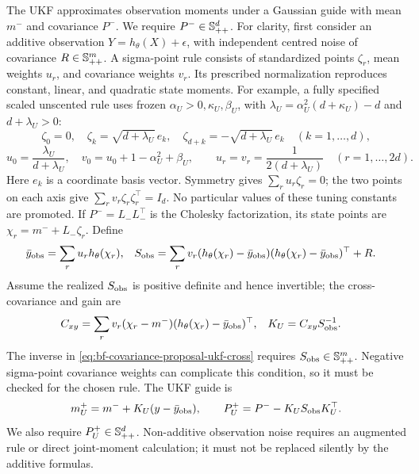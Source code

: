The UKF approximates observation moments under a Gaussian guide with mean
\(m^-\) and covariance \(P^-\). We require \(P^-\in\mathbb S_{++}^d\).
For clarity, first consider an additive observation
\(Y=h_\theta(X)+\epsilon\), with independent centred noise of covariance
\(R\in\mathbb S_{++}^m\). A sigma-point rule consists of standardized points
\(\zeta_r\), mean weights \(u_r\), and covariance weights \(v_r\).
Its prescribed normalization reproduces constant, linear, and quadratic
state moments. For example, a fully specified scaled unscented rule uses
frozen \(\alpha_U>0,\kappa_U,\beta_U\), with
\(\lambda_U=\alpha_U^2(d+\kappa_U)-d\) and \(d+\lambda_U>0\):
\[
 \zeta_0=0,\quad
 \zeta_k=\sqrt{d+\lambda_U}\,e_k,\quad
 \zeta_{d+k}=-\sqrt{d+\lambda_U}\,e_k
 \quad (k=1,\ldots,d),
\]
\[
 u_0=\frac{\lambda_U}{d+\lambda_U},\quad
 v_0=u_0+1-\alpha_U^2+\beta_U,\qquad
 u_r=v_r=\frac{1}{2(d+\lambda_U)}\quad(r=1,\ldots,2d).
\]
Here \(e_k\) is a coordinate basis vector. Symmetry gives
\(\sum_ru_r\zeta_r=0\); the two points on each axis give
\(\sum_rv_r\zeta_r\zeta_r^\top=I_d\).
No particular values of these tuning constants are promoted.
If \(P^-=L_-L_-^\top\) is the Cholesky factorization, its state
points are \(\chi_r=m^-+L_-\zeta_r\). Define
\begin{align}
\label{eq:bf-covariance-proposal-ukf-observation}
 \bar y_{\rm obs}&=\sum_r u_r h_\theta(\chi_r),&
 S_{\rm obs}&=\sum_r v_r(h_\theta(\chi_r)-\bar y_{\rm obs})
                  (h_\theta(\chi_r)-\bar y_{\rm obs})^\top+R.
\end{align}
Assume the realized \(S_{\rm obs}\) is positive definite and hence
invertible; the cross-covariance and gain are
\begin{align}
\label{eq:bf-covariance-proposal-ukf-cross}
 C_{xy}&=\sum_r v_r(\chi_r-m^-)
                  (h_\theta(\chi_r)-\bar y_{\rm obs})^\top,&
 K_U&=C_{xy}S_{\rm obs}^{-1}.
\end{align}
The inverse in \eqref{eq:bf-covariance-proposal-ukf-cross} requires \(S_{\rm obs}\in\mathbb S_{++}^m\).
Negative sigma-point covariance weights can complicate this condition, so it
must be checked for the chosen rule. The UKF guide is
\begin{equation}
\label{eq:bf-covariance-proposal-ukf-update}
 m_U^+=m^-+K_U(y-\bar y_{\rm obs}),\qquad
 P_U^+=P^- - K_US_{\rm obs}K_U^\top.
\end{equation}
We also require \(P_U^+\in\mathbb S_{++}^d\). Non-additive observation noise requires
an augmented rule or direct joint-moment calculation; it must not be
replaced silently by the additive formulas.

